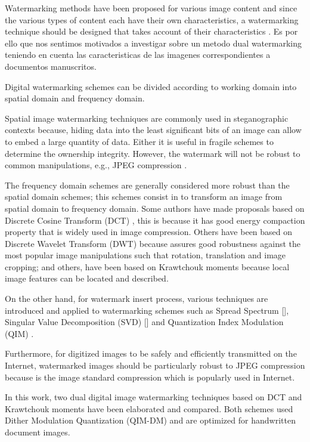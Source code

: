 \documentclass[runningheads]{llncs}
\begin{document}
Watermarking methods have been proposed for various image content and since the various types of content each have their own characteristics, a watermarking technique should be designed that takes account of their characteristics \cite{kang2018spherical}. Es por ello que nos sentimos motivados a investigar sobre un metodo dual watermarking teniendo en cuenta las caracteristicas de las imagenes correspondientes a documentos manuscritos.

Digital watermarking schemes can be divided according to working domain into spatial domain and frequency domain.

Spatial image watermarking techniques are commonly used in steganographic contexts because, hiding data into the least significant bits of an image can allow to embed a large quantity of data. Either it is useful in fragile schemes to determine the ownership integrity. However, the watermark will not be robust to common manipulations, e.g., JPEG compression \cite{cardamone2018dwt}.

The frequency domain schemes are generally considered more robust than the spatial domain schemes; this schemes consist in to transform an image from spatial domain to frequency domain. Some authors have made proposals based on Discrete Cosine Transform (DCT) \cite{munoz2018robust,wang2018blind}, this is because it has good energy compaction property that is widely used in image compression. Others have been based on Discrete Wavelet Transform (DWT) \cite{cardamone2018dwt} because assures good robustness against the most popular image manipulations such that rotation, translation and image cropping; and others, have been based on Krawtchouk moments \cite{avila2018watermarking,liu2017fractional,papakostas2014moment,Yap2004} because local image features can be located and described.

On the other hand, for watermark insert process, various techniques are introduced and applied to watermarking schemes such as Spread Spectrum [], Singular Value Decomposition (SVD) [] and Quantization Index Modulation (QIM) \cite{avila2018watermarking}.

Furthermore, for digitized images to be safely and efficiently transmitted on the Internet, watermarked images should be particularly robust to JPEG compression because is the image standard compression which is popularly used in Internet.

In this work, two dual digital image watermarking techniques based on DCT and Krawtchouk moments have been elaborated and compared. Both schemes used Dither Modulation Quantization (QIM-DM) and are optimized for handwritten document images. 
\end{document}
